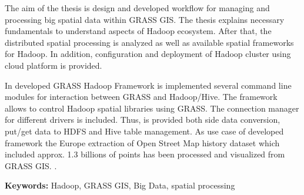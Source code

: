 \documentclass[a4paper,12pt,oneside]{report}
\author{Matěj Krejčí}
\newenvironment{abstractpage}
{\cleardoublepage\vspace*{\fill}\thispagestyle{empty}}
{\vfill\cleardoublepage}
\newenvironment{abstractx}[1]
{\bigskip\selectlanguage{#1}%
	\begin{center}\bfseries\abstractname\end{center}}
{\par\bigskip}
\newcommand{\klicslova}[2]{\noindent\textbf{#1: }#2}
\begin{document}
	\pagestyle{empty}
	
	\renewcommand*\listfigurename{List of figures}
	 
	\renewcommand*\listtablename{List of  Tables}
	
	\renewcommand{\bibname}{References}
	\renewcommand{\contentsname}{Content}
	\renewcommand{\figurename}{Fig.}
	\renewcommand{\tablename}{Tab.}
	
	
	
	
	\renewcommand\footnotelayout{\footnotesize}
	
	
	
	\newpage
	
	\newpage
	\begin{abstractpage}
		\begin{abstractx}{english}
			
			The aim of the thesis is design and developed workflow for managing and processing big spatial data within GRASS GIS. The thesis explains necessary fundamentals to understand aspects of Hadoop ecosystem. After that, the  distributed spatial processing is analyzed as well as available spatial frameworks for Hadoop. In addition, configuration
			and deployment of Hadoop cluster using cloud platform is provided.
			
			In developed GRASS Hadoop Framework is implemented several command line  modules for interaction between GRASS and Hadoop/Hive. The framework allows to control Hadoop spatial libraries using GRASS. The connection manager for different drivers is included. Thus, 
			is provided both side data conversion, put/get data to HDFS and Hive table management. As use case of developed framework the Europe extraction of Open Street Map history dataset which included approx. 1.3 billions of points has been processed and visualized from GRASS GIS. .
			
			\klicslova{Keywords}{Hadoop, GRASS GIS, Big Data, spatial processing}
		\end{abstractx}
	\end{abstractpage}
	
	
	
\end{document}
